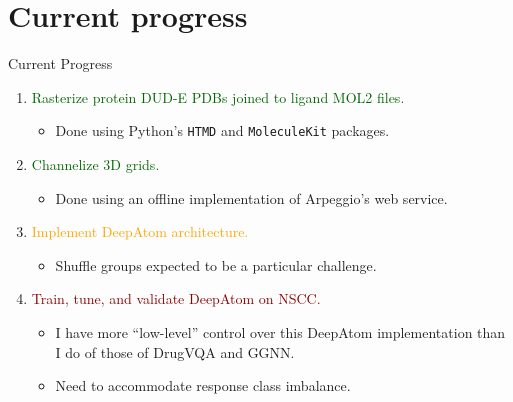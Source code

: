 \documentclass[aspectratio=169,xcolor=dvipsnames]{beamer}
\begin{document}
\section{Current progress}
\begin{frame}{Current Progress}
    \begin{enumerate}
        \item \textcolor{darkgreen}{Rasterize protein DUD-E PDBs joined to ligand MOL2 files.}
        \begin{itemize}
            \item Done using Python's \texttt{HTMD} and \texttt{MoleculeKit} packages.
        \end{itemize}
        \item \textcolor{darkgreen}{Channelize 3D grids.}
        \begin{itemize}
            \item Done using an offline implementation of Arpeggio's web service.
        \end{itemize}
        \item \textcolor{orange}{Implement DeepAtom architecture.}
        \begin{itemize}
            \item Shuffle groups expected to be a particular challenge.
        \end{itemize}
        \item \textcolor{darkred}{Train, tune, and validate DeepAtom on NSCC.}
        \begin{itemize}
            \item I have more ``low-level'' control over this DeepAtom implementation than I do of those of DrugVQA and GGNN.
            \item Need to accommodate response class imbalance.
        \end{itemize}
    \end{enumerate}
\end{frame}


\end{document}
